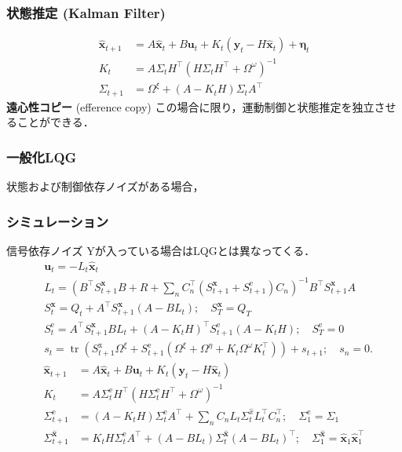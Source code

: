 \subsubsection{状態推定 (Kalman Filter)}
\begin{align}
\widehat{\mathbf{x}}_{t+1}&=A \widehat{\mathbf{x}}_{t}+B \mathbf{u}_{t}+K_{t}\left(\mathbf{y}_{t}-H \widehat{\mathbf{x}}_{t}\right)+\boldsymbol{\eta}_{t} \\ 
K_{t}&=A \Sigma_{t} H^{\top}\left(H \Sigma_{t} H^{\top}+\Omega^{\omega}\right)^{-1} \\ 
\Sigma_{t+1}&=\Omega^{\xi}+\left(A-K_{t} H\right) \Sigma_{t} A^{\top}
\end{align}
\textbf{遠心性コピー} (efference copy)
この場合に限り，運動制御と状態推定を独立させることができる．
\subsubsection{一般化LQG}
状態および制御依存ノイズがある場合，
\subsubsection{シミュレーション}
信号依存ノイズ Yが入っている場合はLQGとは異なってくる．
\begin{align}
&\mathbf{u}_{t}=-L_{t} \hat{\mathbf{x}}_{t} \\
&L_{t}=\left(B^\top S_{t+1}^{\mathbf{x}} B+R+\sum_{n} C_{n}^\top\left(S_{t+1}^{\mathbf{x}}+S_{t+1}^{\mathrm{e}}\right) C_{n}\right)^{-1} B^\top S_{t+1}^{\mathbf{x}} A \\
&S_{t}^{\mathbf{x}}=Q_{t}+A^\top S_{t+1}^{\mathbf{x}}\left(A-B L_{t}\right) ; \quad S_{T}^{\mathbf{x}}=Q_{T} \\
&S_{t}^{\mathrm{e}}=A^\top S_{t+1}^{\mathbf{x}} B L_t+\left(A-K_{t} H\right)^\top S_{t+1}^{\mathrm{e}}\left(A-K_{t} H\right) ; \quad S_{T}^{\mathrm{e}}=0\\
&s_{t}=\operatorname{tr}\left(S_{t+1}^{\mathrm{x}}\Omega^{\xi}+S_{t+1}^{\mathrm{e}}\left(\Omega^{\xi}+\Omega^{\eta}+K_{t} \Omega^{\omega} K_{t}^{\top}\right)\right)+s_{t+1} ; \quad s_{n}=0 .
\end{align}
\begin{align}
\hat{\mathbf{x}}_{t+1} &=A \hat{\mathbf{x}}_{t}+B \mathbf{u}_{t}+K_{t}\left(\mathbf{y}_{t}-H \hat{\mathbf{x}}_{t}\right) \\
K_{t} &=A \Sigma_{t}^{\mathrm{e}} H^\top\left(H \Sigma_{t}^{\mathrm{e}} H^\top+\Omega^{\omega}\right)^{-1} \\
\Sigma_{t+1}^{\mathrm{e}} &=\left(A-K_{t} H\right) \Sigma_{t}^{\mathrm{e}} A^\top+\sum_{n} C_{n} L_{t} \Sigma_{t}^{\hat{x}} L_{t}^\top C_{n}^\top ; \quad \Sigma_{1}^{\mathrm{e}}=\Sigma_{1} \\
\Sigma_{t+1}^{\hat{\mathbf{x}}} &=K_{t} H \Sigma_{t}^{\mathrm{e}} A^\top+\left(A-B L_{t}\right) \Sigma_{t}^{\hat{\mathbf{x}}}\left(A-B L_{t}\right)^\top ; \quad \Sigma_{1}^{\hat{\mathbf{x}}}=\hat{\mathbf{x}}_{1} \hat{\mathbf{x}}_{1}^\top
\end{align}
